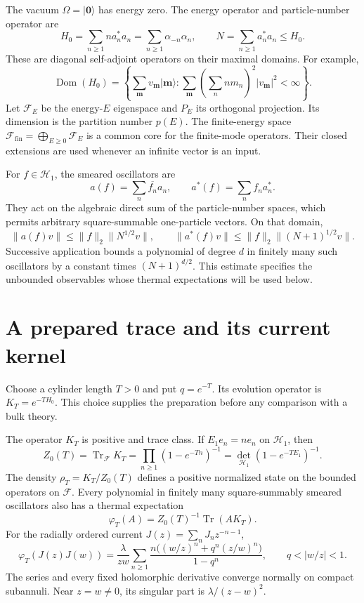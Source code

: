 The vacuum \(\Omega=\lvert\mathbf0\rangle\) has energy zero.
The energy operator and particle-number operator are
\[
 H_0=\sum_{n\geq1}n a_n^*a_n
     =\sum_{n\geq1}\alpha_{-n}\alpha_n,
 \qquad N=\sum_{n\geq1}a_n^*a_n\leq H_0.
\]
These are diagonal self-adjoint operators on their maximal domains.
For example,
\[
 \operatorname{Dom}(H_0)
 =\left\{\sum_{\mathbf m}v_{\mathbf m}\lvert\mathbf m\rangle:
   \sum_{\mathbf m}\left(\sum_n n m_n\right)^2
              |v_{\mathbf m}|^2<\infty\right\}.
\]
Let \(\mathcal F_E\) be the energy-\(E\) eigenspace and \(P_E\)
its orthogonal projection. Its dimension is the partition number
\(p(E)\). The finite-energy space
\(\mathcal F_{\mathrm{fin}}=\bigoplus_{E\geq0}\mathcal F_E\)
is a common core for the finite-mode operators. Their closed extensions
are used whenever an infinite vector is an input.

For \(f\in\mathcal H_1\), the smeared oscillators are
\[
 a(f)=\sum_n\overline{f_n}a_n,\qquad
 a^*(f)=\sum_n f_n a_n^*.
\]
They act on the algebraic direct sum of the particle-number spaces,
which permits arbitrary square-summable one-particle vectors.
On that domain,
\[
 \|a(f)v\|\leq\|f\|_2\|N^{1/2}v\|,
 \qquad
 \|a^*(f)v\|\leq\|f\|_2\|(N+1)^{1/2}v\|.
\]
Successive application bounds a polynomial of degree \(d\) in finitely
many such oscillators by a constant times \((N+1)^{d/2}\).
This estimate specifies the unbounded observables whose thermal
expectations will be used below.

\section{A prepared trace and its current kernel}

Choose a cylinder length \(T>0\) and put \(q=e^{-T}\).
Its evolution operator is \(K_T=e^{-TH_0}\). This choice supplies
the preparation before any comparison with a bulk theory.

\begin{theorem}\label{thm:vol2-fock-thermal-state}
The operator \(K_T\) is positive and trace class. If
\(E_1 e_n=n e_n\) on \(\mathcal H_1\), then
\begin{equation}\label{eq:vol2-fock-partition}
 Z_0(T)=\operatorname{Tr}_{\mathcal F}K_T
 =\prod_{n\geq1}(1-e^{-Tn})^{-1}
 =\det_{\mathcal H_1}(1-e^{-TE_1})^{-1}.
\end{equation}
The density \(\rho_T=K_T/Z_0(T)\) defines a positive normalized
state on the bounded operators on \(\mathcal F\). Every polynomial
in finitely many square-summably smeared oscillators also has a
thermal expectation
\[
 \varphi_T(A)=Z_0(T)^{-1}\operatorname{Tr}(A K_T).
\]
For the radially ordered current \(J(z)=\sum_nJ_nz^{-n-1}\),
\begin{equation}\label{eq:vol2-thermal-current}
 \varphi_T(J(z)J(w))
 =\frac{\lambda}{zw}\sum_{n\geq1}
 \frac{n\bigl((w/z)^n+q^n(z/w)^n\bigr)}{1-q^n},
 \qquad q<|w/z|<1.
\end{equation}
The series and every fixed holomorphic derivative converge normally
on compact subannuli. Near \(z=w\ne0\), its singular part is
\(\lambda/(z-w)^2\).
\end{theorem}

